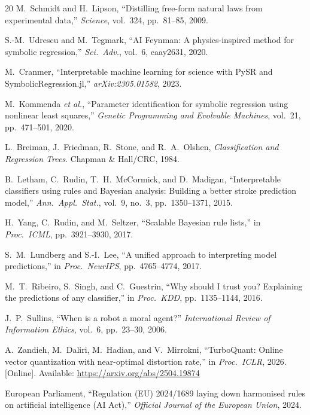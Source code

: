 \documentclass[journal]{IEEEtran}
\begin{document}
\begin{thebibliography}{20}
M.~Schmidt and H.~Lipson, ``Distilling free-form natural laws from
experimental data,'' \emph{Science}, vol.~324, pp.~81--85, 2009.

S.-M.~Udrescu and M.~Tegmark, ``AI Feynman: A physics-inspired
method for symbolic regression,'' \emph{Sci.\ Adv.}, vol.~6,
eaay2631, 2020.

M.~Cranmer, ``Interpretable machine learning for science with PySR
and SymbolicRegression.jl,'' \emph{arXiv:2305.01582}, 2023.

M.~Kommenda \emph{et al.}, ``Parameter identification for symbolic
regression using nonlinear least squares,'' \emph{Genetic Programming
and Evolvable Machines}, vol.~21, pp.~471--501, 2020.

L.~Breiman, J.~Friedman, R.~Stone, and R.~A.~Olshen,
\emph{Classification and Regression Trees}.
Chapman \& Hall/CRC, 1984.

B.~Letham, C.~Rudin, T.~H.~McCormick, and D.~Madigan,
``Interpretable classifiers using rules and Bayesian analysis:
Building a better stroke prediction model,''
\emph{Ann.\ Appl.\ Stat.}, vol.~9, no.~3, pp.~1350--1371, 2015.

H.~Yang, C.~Rudin, and M.~Seltzer, ``Scalable Bayesian rule lists,''
in \emph{Proc.\ ICML}, pp.~3921--3930, 2017.

S.~M.~Lundberg and S.-I.~Lee, ``A unified approach to interpreting
model predictions,'' in \emph{Proc.\ NeurIPS}, pp.~4765--4774, 2017.

M.~T.~Ribeiro, S.~Singh, and C.~Guestrin, ``Why should I trust you?
Explaining the predictions of any classifier,'' in \emph{Proc.\ KDD},
pp.~1135--1144, 2016.

J.~P.~Sullins, ``When is a robot a moral agent?''
\emph{International Review of Information Ethics}, vol.~6,
pp.~23--30, 2006.

A.~Zandieh, M.~Daliri, M.~Hadian, and V.~Mirrokni,
``TurboQuant: Online vector quantization with near-optimal
distortion rate,'' in \emph{Proc.\ ICLR}, 2026.
[Online]. Available: \url{https://arxiv.org/abs/2504.19874}

European Parliament, ``Regulation (EU) 2024/1689 laying down
harmonised rules on artificial intelligence (AI Act),''
\emph{Official Journal of the European Union}, 2024.


\end{thebibliography}
\end{document}

